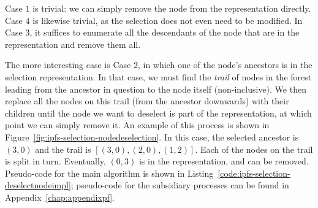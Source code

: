 \noindent Case $1$ is trivial: we can simply remove the node from the representation directly. Case $4$ is likewise trivial, as the selection does not even need to be modified. In Case $3$, it suffices to enumerate all the descendants of the node that are in the representation and remove them all.

The more interesting case is Case $2$, in which one of the node's ancestors is in the selection representation. In that case, we must find the \emph{trail} of nodes in the forest leading from the ancestor in question to the node itself (non-inclusive). We then replace all the nodes on this trail (from the ancestor downwards) with their children until the node we want to deselect is part of the representation, at which point we can simply remove it. An example of this process is shown in Figure~\ref{fig:ipfs-selection-nodedeselection}. In this case, the selected ancestor is $(3,0)$ and the trail is $[(3,0), (2,0), (1,2)]$. Each of the nodes on the trail is split in turn. Eventually, $(0,3)$ is in the representation, and can be removed. Pseudo-code for the main algorithm is shown in Listing~\ref{code:ipfs-selection-deselectnodeimpl}; pseudo-code for the subsidiary processes can be found in Appendix~\ref{chap:appendixpf}.

